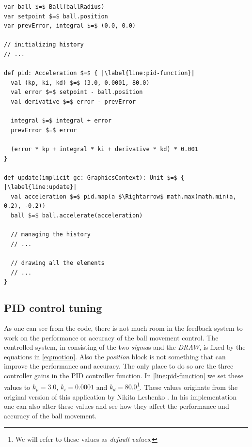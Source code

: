 \begin{minipage}{\linewidth}
\begin{lstlisting}[style=ScalaStyle, caption={Ball drawing}, label={lst:ball-feedback}]
var ball $=$ Ball(ballRadius)
var setpoint $=$ ball.position
var prevError, integral $=$ (0.0, 0.0)

// initializing history
// ...

def pid: Acceleration $=$ { |\label{line:pid-function}|
  val (kp, ki, kd) $=$ (3.0, 0.0001, 80.0)
  val error $=$ setpoint - ball.position
  val derivative $=$ error - prevError

  integral $=$ integral + error
  prevError $=$ error

  (error * kp + integral * ki + derivative * kd) * 0.001
}

def update(implicit gc: GraphicsContext): Unit $=$ { |\label{line:update}|
  val acceleration $=$ pid.map(a $\Rightarrow$ math.max(math.min(a, 0.2), -0.2))
  ball $=$ ball.accelerate(acceleration)

  // managing the history
  // ...

  // drawing all the elements
  // ...
}
\end{lstlisting}
\end{minipage}

\subsection*{PID control tuning}
As one can see from the code, there is not much room in the feedback system to work on the performance or accuracy of the ball movement control. The controlled system, in  consisting of the two \textit{sigma}s and the \textit{DRAW}, is fixed by the equations in \ref{eq:motion}. Also the \textit{position} block is not something that can improve the performance and accuracy. The only place to do so are the three controller gains in the PID controller function. In  \cref{line:pid-function} we set these values to $k_p = 3.0$, $k_i = 0.0001$ and $k_d = 80.0$\footnote{We will refer to these values as \textit{default values}.}. These values originate from the original version of this application by Nikita Leshenko \cite{nikital-balltracker}. In his implementation one can also alter these values and see how they affect the performance and accuracy of the ball movement.

